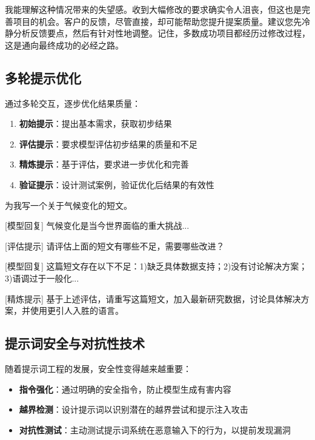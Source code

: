 \documentclass[12pt]{ctexart}
\begin{document}
\begin{outputbox}
我能理解这种情况带来的失望感。收到大幅修改的要求确实令人沮丧，但这也是完善项目的机会。客户的反馈，尽管直接，却可能帮助您提升提案质量。建议您先冷静分析反馈要点，然后有针对性地调整。记住，多数成功项目都经历过修改过程，这是通向最终成功的必经之路。
\end{outputbox}

\subsection{多轮提示优化}
通过多轮交互，逐步优化结果质量：

\begin{enumerate}
  \item \textbf{初始提示}：提出基本需求，获取初步结果
  \item \textbf{评估提示}：要求模型评估初步结果的质量和不足
  \item \textbf{精炼提示}：基于评估，要求进一步优化和完善
  \item \textbf{验证提示}：设计测试案例，验证优化后结果的有效性
\end{enumerate}

\begin{promptbox}
[初始提示] 为我写一个关于气候变化的短文。

[模型回复] 气候变化是当今世界面临的重大挑战...

[评估提示] 请评估上面的短文有哪些不足，需要哪些改进？

[模型回复] 这篇短文存在以下不足：1)缺乏具体数据支持；2)没有讨论解决方案；3)语调过于一般化...

[精炼提示] 基于上述评估，请重写这篇短文，加入最新研究数据，讨论具体解决方案，并使用更引人入胜的语言。
\end{promptbox}

\subsection{提示词安全与对抗性技术}
随着提示词工程的发展，安全性变得越来越重要：

\begin{itemize}
  \item \textbf{指令强化}：通过明确的安全指令，防止模型生成有害内容
  \item \textbf{越界检测}：设计提示词以识别潜在的越界尝试和提示注入攻击
  \item \textbf{对抗性测试}：主动测试提示词系统在恶意输入下的行为，以提前发现漏洞
\end{itemize}
\end{document}
